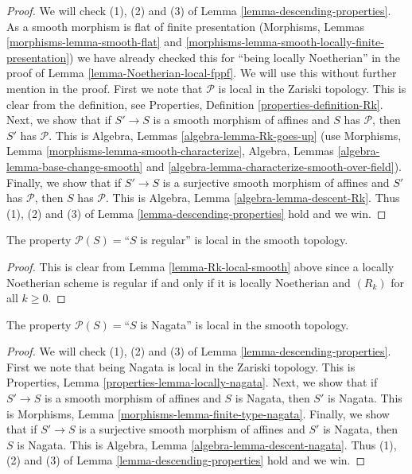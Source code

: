\begin{proof}
We will check (1), (2) and (3) of Lemma \ref{lemma-descending-properties}.
As a smooth morphism is flat of finite presentation
(Morphisms, Lemmas \ref{morphisms-lemma-smooth-flat}
and \ref{morphisms-lemma-smooth-locally-finite-presentation})
we have already checked this for ``being locally Noetherian'' in the proof
of Lemma \ref{lemma-Noetherian-local-fppf}.
We will use this without further mention in the proof.
First we note that $\mathcal{P}$ is local in the Zariski topology.
This is clear from the definition,
see Properties, Definition \ref{properties-definition-Rk}.
Next, we show that if $S' \to S$ is a smooth morphism of affines
and $S$ has $\mathcal{P}$, then $S'$ has $\mathcal{P}$. This
is Algebra, Lemmas \ref{algebra-lemma-Rk-goes-up}
(use Morphisms, Lemma \ref{morphisms-lemma-smooth-characterize},
Algebra, Lemmas \ref{algebra-lemma-base-change-smooth}
and \ref{algebra-lemma-characterize-smooth-over-field}).
Finally, we show that if $S' \to S$ is a surjective
smooth morphism of affines and $S'$ has $\mathcal{P}$,
then $S$ has $\mathcal{P}$. This is
Algebra, Lemma \ref{algebra-lemma-descent-Rk}.
Thus (1), (2) and (3) of Lemma \ref{lemma-descending-properties} hold
and we win.
\end{proof}

\begin{lemma}
\label{lemma-regular-local-smooth}
The property $\mathcal{P}(S) =$``$S$ is regular''
is local in the smooth topology.
\end{lemma}

\begin{proof}
This is clear from Lemma \ref{lemma-Rk-local-smooth}
above since a locally Noetherian scheme is regular if and only if
it is locally Noetherian and $(R_k)$ for all $k \geq 0$.
\end{proof}

\begin{lemma}
\label{lemma-Nagata-local-smooth}
The property $\mathcal{P}(S) =$``$S$ is Nagata''
is local in the smooth topology.
\end{lemma}

\begin{proof}
We will check (1), (2) and (3) of Lemma \ref{lemma-descending-properties}.
First we note that being Nagata is local in the Zariski topology.
This is Properties, Lemma \ref{properties-lemma-locally-nagata}.
Next, we show that if $S' \to S$ is a smooth morphism of affines
and $S$ is Nagata, then $S'$ is Nagata. This
is Morphisms, Lemma \ref{morphisms-lemma-finite-type-nagata}.
Finally, we show that if $S' \to S$ is a surjective
smooth morphism of affines and $S'$ is Nagata,
then $S$ is Nagata. This is
Algebra, Lemma \ref{algebra-lemma-descent-nagata}.
Thus (1), (2) and (3) of Lemma \ref{lemma-descending-properties} hold
and we win.
\end{proof}





